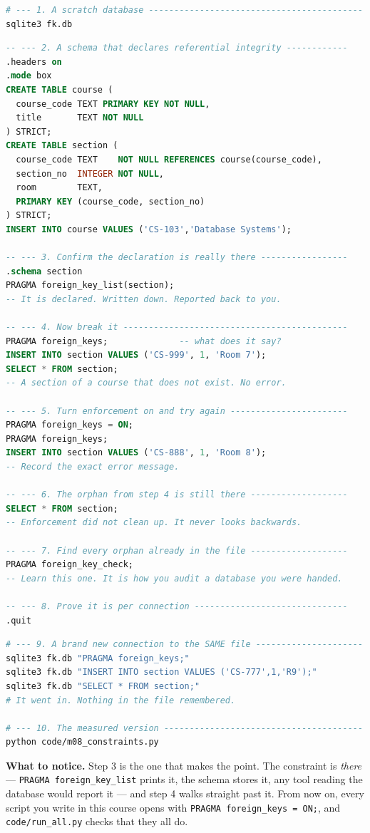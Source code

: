 \begin{lab}
\begin{lstlisting}[language=bash]
# --- 1. A scratch database ------------------------------------------
sqlite3 fk.db
\end{lstlisting}
\begin{lstlisting}[language=sql]
-- --- 2. A schema that declares referential integrity ------------
.headers on
.mode box
CREATE TABLE course (
  course_code TEXT PRIMARY KEY NOT NULL,
  title       TEXT NOT NULL
) STRICT;
CREATE TABLE section (
  course_code TEXT    NOT NULL REFERENCES course(course_code),
  section_no  INTEGER NOT NULL,
  room        TEXT,
  PRIMARY KEY (course_code, section_no)
) STRICT;
INSERT INTO course VALUES ('CS-103','Database Systems');

-- --- 3. Confirm the declaration is really there -----------------
.schema section
PRAGMA foreign_key_list(section);
-- It is declared. Written down. Reported back to you.

-- --- 4. Now break it --------------------------------------------
PRAGMA foreign_keys;              -- what does it say?
INSERT INTO section VALUES ('CS-999', 1, 'Room 7');
SELECT * FROM section;
-- A section of a course that does not exist. No error.

-- --- 5. Turn enforcement on and try again -----------------------
PRAGMA foreign_keys = ON;
PRAGMA foreign_keys;
INSERT INTO section VALUES ('CS-888', 1, 'Room 8');
-- Record the exact error message.

-- --- 6. The orphan from step 4 is still there -------------------
SELECT * FROM section;
-- Enforcement did not clean up. It never looks backwards.

-- --- 7. Find every orphan already in the file -------------------
PRAGMA foreign_key_check;
-- Learn this one. It is how you audit a database you were handed.

-- --- 8. Prove it is per connection ------------------------------
.quit
\end{lstlisting}
\begin{lstlisting}[language=bash]
# --- 9. A brand new connection to the SAME file ---------------------
sqlite3 fk.db "PRAGMA foreign_keys;"
sqlite3 fk.db "INSERT INTO section VALUES ('CS-777',1,'R9');"
sqlite3 fk.db "SELECT * FROM section;"
# It went in. Nothing in the file remembered.

# --- 10. The measured version ---------------------------------------
python code/m08_constraints.py
\end{lstlisting}

\smallskip
\textbf{What to notice.} Step 3 is the one that makes the point. The constraint
is \emph{there} --- \texttt{PRAGMA foreign\_key\_list} prints it, the schema
stores it, any tool reading the database would report it --- and step 4 walks
straight past it. From now on, every script you write in this course opens
with \texttt{PRAGMA foreign\_keys = ON;}, and \texttt{code/run\_all.py}
checks that they all do.
\end{lab}

